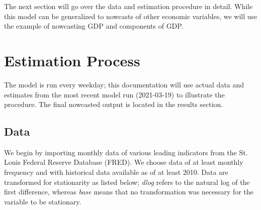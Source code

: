 \documentclass[11pt, letterpaper]{article}\usepackage[]{graphicx}\usepackage[]{color}
\begin{document}
The next section will go over the data and estimation procedure in detail. While this model can be generalized to nowcasts of other economic variables, we will use the example of nowcasting GDP and components of GDP.

\newpage
\section{Estimation Process}
The model is run every weekday; this documentation will use actual data and estimates from the most recent model run (2021-03-19) to illustrate the procedure. The final nowcasted output is located in the results section.

\subsection{Data}
We begin by importing monthly data of various leading indicators from the St. Louis Federal Reserve Database (FRED). We choose data of at least monthly frequency and with historical data available as of at least 2010. Data are transformed for stationarity as listed below; \textit{dlog} refers to the natural log of the first difference, whereas \textit{base} means that no transformation was necessary for the variable to be stationary.
\end{document}

